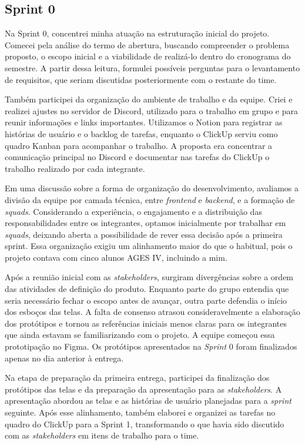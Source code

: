 \subsection{Sprint 0}

Na Sprint 0, concentrei minha atuação na estruturação inicial do projeto. Comecei pela análise do termo de abertura, buscando
compreender o problema proposto, o escopo inicial e a viabilidade de realizá-lo
dentro do cronograma do semestre. A partir dessa leitura, formulei possíveis
perguntas para o levantamento de requisitos, que seriam discutidas posteriormente
com o restante do time.

Também participei da organização do ambiente de trabalho e da equipe. Criei e
realizei ajustes no servidor de Discord, utilizado para o trabalho em grupo e
para reunir informações e links importantes. Utilizamos o Notion para registrar
as histórias de usuário e o backlog de tarefas, enquanto o ClickUp serviu como
quadro Kanban para acompanhar o trabalho. A proposta era concentrar a
comunicação principal no Discord e documentar nas tarefas do ClickUp o trabalho
realizado por cada integrante.

Em uma discussão sobre a forma de organização do desenvolvimento, avaliamos a
divisão da equipe por camada técnica, entre \textit{frontend} e \textit{backend}, e
a formação de \textit{squads}. Considerando a experiência, o engajamento e a
distribuição das responsabilidades entre os integrantes, optamos inicialmente por
trabalhar em \textit{squads}, deixando aberta a possibilidade de rever essa decisão
após a primeira sprint. Essa organização exigiu um alinhamento maior do que o
habitual, pois o projeto contava com cinco alunos AGES IV,
incluindo a mim.

Após a reunião inicial com as \textit{stakeholders}, surgiram divergências sobre a
ordem das atividades de definição do produto. Enquanto parte do grupo entendia
que seria necessário fechar o escopo antes de avançar, outra parte defendia o
início dos esboços das telas. A falta de consenso atrasou consideravelmente a
elaboração dos protótipos e tornou as referências iniciais menos claras para os
integrantes que ainda estavam se familiarizando com o projeto. A equipe começou
essa prototipação no Figma. Os protótipos apresentados na \textit{Sprint} 0 foram
finalizados apenas no dia anterior à entrega.

Na etapa de preparação da primeira entrega, participei da finalização dos
protótipos das telas e da preparação da apresentação para as
\textit{stakeholders}. A apresentação abordou as telas e as histórias de usuário
planejadas para a \textit{sprint} seguinte. Após esse alinhamento, também elaborei e
organizei as tarefas no quadro do ClickUp para a Sprint 1, transformando o que
havia sido discutido com as \textit{stakeholders} em itens de trabalho para o
time.
\\


